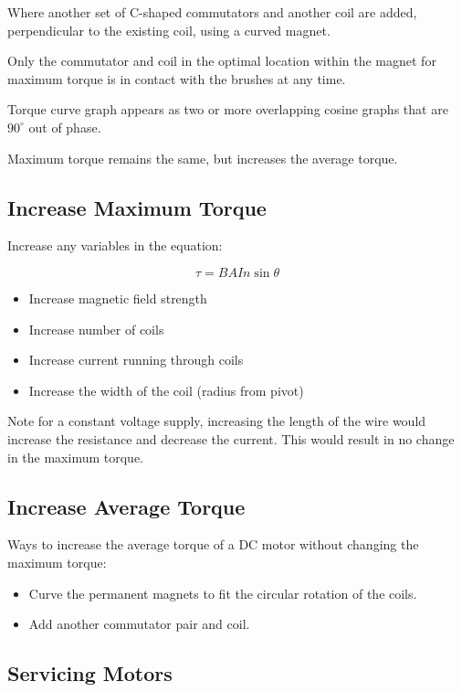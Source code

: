 \documentclass[a4paper,11pt]{article}
\begin{document}
Where another set of C-shaped commutators and another coil are added,
perpendicular to the existing coil, using a curved magnet.

Only the commutator and coil in the optimal location within the magnet for
maximum torque is in contact with the brushes at any time.

Torque curve graph appears as two or more overlapping cosine graphs that are
$90^\circ$ out of phase.

Maximum torque remains the same, but increases the average torque.


\subsection{Increase Maximum Torque}

Increase any variables in the equation:

$$
\tau = B A I n \sin{\theta}
$$

\begin{itemize}
\item Increase magnetic field strength
\item Increase number of coils
\item Increase current running through coils
\item Increase the width of the coil (radius from pivot)
\end{itemize}

Note for a constant voltage supply, increasing the length of the wire would
increase the resistance and decrease the current. This would result in no
change in the maximum torque.


\subsection{Increase Average Torque}

Ways to increase the average torque of a DC motor without changing the maximum
torque:

\begin{itemize}
\item Curve the permanent magnets to fit the circular rotation of the coils.
\item Add another commutator pair and coil.
\end{itemize}


\subsection{Servicing Motors}
\end{document}
